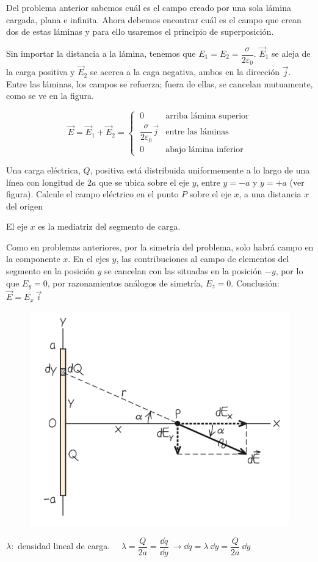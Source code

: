 Del problema anterior sabemos cuál es el campo creado por una sola lámina cargada, plana e infinita. Ahora debemos encontrar cuál es el campo que crean dos de estas láminas y para ello usaremos el principio de superposición.

Sin importar la distancia a la lámina, tenemos que $E_1=E_2=\dfrac{\sigma}{2\varepsilon_0}$. $\vec E_1$ se aleja de la carga positiva y $\vec E_2$ se acerca a la caga negativa, ambos en la dirección $\vec j$. Entre las láminas, los campos se refuerza; fuera de ellas, se cancelan mutuamente, como se ve en la figura.

$$\vec E=\vec E_1+\vec E_2=\begin{cases}
\ 0 & \text{arriba lámina superior}	 \\
\ \dfrac{\sigma}{2\varepsilon_0} \vec j & \text{entre las láminas} \\
\ 0 & \text{abajo lámina inferior}
\end{cases}$$


\begin{prob}
Una carga eléctrica, $Q$, positiva está distribuida uniformemente a lo largo de una línea con longitud de $2a$ que se ubica sobre el eje $y$, entre $y=-a$ y $y=+a$ (ver figura). Calcule el campo eléctrico en el punto $P$ sobre el eje $x$, a una distancia $x$ del origen
\end{prob}
El eje $x$ es la mediatriz del segmento de carga.
\begin{multicols}{2}
	Como en problemas anteriores, por la simetría del problema, solo habrá campo en la componente $x$. En el ejes $y$, las contribuciones al campo de elementos del segmento en la posición $y$ se cancelan con las situadas en la posición $-y$, por lo que $E_y=0$, por razonamientos análogos de simetría, $E_z=0$. Conclusión: $\vec E = E_x \ \vec i$
\begin{figure}[H]
	\centering
	\includegraphics[width=.55\textwidth]{imagenes/imagenes22/T22IM23.png}
\end{figure}
\end{multicols}
$\lambda:$ densidad lineal de carga.  $\quad \lambda=\dfrac Q{2a}=\dfrac{\dd q}{\dd y} \ \to \dd q=\lambda \ \dd y=\dfrac{Q}{2a} \ \dd y$
 
